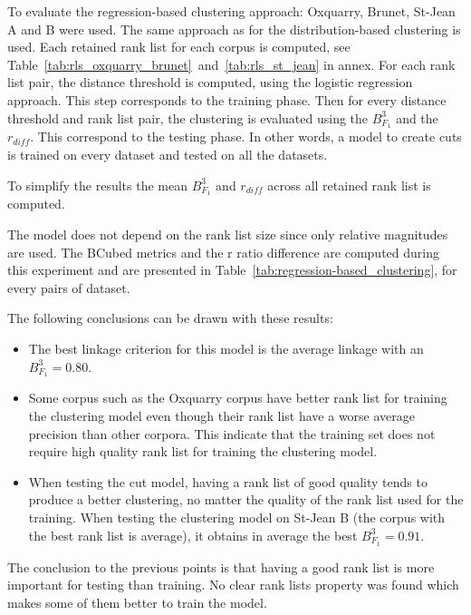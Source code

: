To evaluate the regression-based clustering approach: Oxquarry, Brunet, St-Jean A and B were used.
The same approach as for the distribution-based clustering is used.
Each retained rank list for each corpus is computed, see Table~\ref{tab:rls_oxquarry_brunet}~and~\ref{tab:rls_st_jean} in annex.
For each rank list pair, the distance threshold is computed, using the logistic regression approach.
This step corresponds to the training phase.
Then for every distance threshold and rank list pair, the clustering is evaluated using the $B^3_{F_1}$ and the $r_{diff}$.
This correspond to the testing phase.
In other words, a model to create cuts is trained on every dataset and tested on all the datasets.

To simplify the results the mean $B^3_{F_1}$ and $r_{diff}$ across all retained rank list is computed.

The model does not depend on the rank list size since only relative magnitudes are used.
The BCubed metrics and the r ratio difference are computed during this experiment and are presented in Table~\ref{tab:regression-based_clustering}, for every pairs of dataset.

The following conclusions can be drawn with these results:
\begin{itemize}
  \item
  The best linkage criterion for this model is the average linkage with an $B^3_{F_1} = 0.80$.
  \item
  Some corpus such as the Oxquarry corpus have better rank list for training the clustering model even though their rank list have a worse average precision than other corpora.
  This indicate that the training set does not require high quality rank list for training the clustering model.
  \item
  When testing the cut model, having a rank list of good quality tends to produce a better clustering, no matter the quality of the rank list used for the training.
  When testing the clustering model on St-Jean B (the corpus with the best rank list is average), it obtains in average the best $B^3_{F_1} = 0.91$.
\end{itemize}

The conclusion to the previous points is that having a good rank list is more important for testing than training.
No clear rank lists property was found which makes some of them better to train the model.

